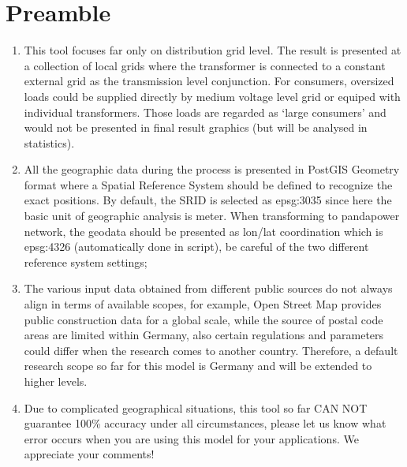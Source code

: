 \documentclass[letterpaper,10pt,english]{sphinxmanual}
\begin{document}
\section{Preamble}
\label{\detokenize{index:preamble}}\begin{enumerate}
%
\item {} 
\sphinxAtStartPar
This tool focuses far only on distribution grid level. The result is presented at a collection of local grids
where the transformer is connected to a constant external grid as the transmission level conjunction. For
consumers, over\sphinxhyphen{}sized loads could be supplied directly by medium voltage level grid or equiped with individual
transformers. Those loads are regarded as ‘large consumers’ and would not be presented in final result graphics (but
will be analysed in statistics).

\item {} 
\sphinxAtStartPar
All the geographic data during the process is presented in PostGIS Geometry format where a Spatial Reference System
should be defined to recognize the exact positions. By default, the SRID is selected as epsg:3035 since here the
basic unit of geographic analysis is meter. When transforming to pandapower network, the geodata should be presented
as lon/lat coordination which is epsg:4326 (automatically done in script), be careful of the two different reference
system settings;

\item {} 
\sphinxAtStartPar
The various input data obtained from different public sources do not always align in terms of available scopes, for
example, Open Street Map provides public construction data for a global scale, while the source of postal code areas
are limited within Germany, also certain regulations and parameters could differ when the research comes to another
country. Therefore, a default research scope so far for this model is Germany and will be extended to higher levels.

\item {} 
\sphinxAtStartPar
Due to complicated geographical situations, this tool so far CAN NOT guarantee 100\% accuracy under all circumstances,
please let us know what error occurs when you are using this model for your applications. We appreciate your
comments!

\end{enumerate}
\end{document}
